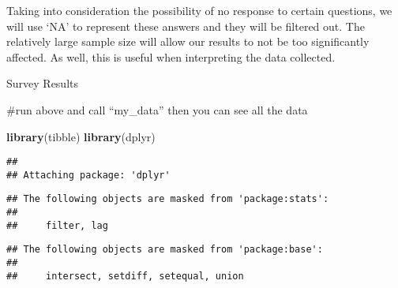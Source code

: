 \documentclass[
]{article}
\newenvironment{Shaded}{\begin{snugshade}}{\end{snugshade}}
\newcommand{\KeywordTok}[1]{\textcolor[rgb]{0.13,0.29,0.53}{\textbf{#1}}}
\newcommand{\NormalTok}[1]{#1}
\begin{document}
Taking into consideration the possibility of no response to certain
questions, we will use `NA' to represent these answers and they will be
filtered out. The relatively large sample size will allow our results to
not be too significantly affected. As well, this is useful when
interpreting the data collected.

Survey Results

\#run above and call ``my\_data'' then you can see all the data

\begin{Shaded}
\begin{Highlighting}[]
\KeywordTok{library}\NormalTok{(tibble)}
\KeywordTok{library}\NormalTok{(dplyr)}
\end{Highlighting}
\end{Shaded}

\begin{verbatim}
## 
## Attaching package: 'dplyr'
\end{verbatim}

\begin{verbatim}
## The following objects are masked from 'package:stats':
## 
##     filter, lag
\end{verbatim}

\begin{verbatim}
## The following objects are masked from 'package:base':
## 
##     intersect, setdiff, setequal, union
\end{verbatim}
\end{document}
